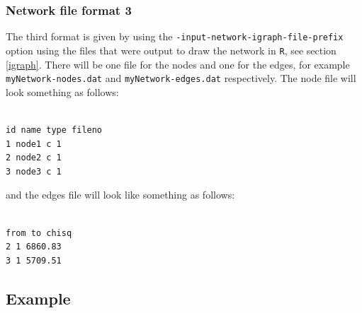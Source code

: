 \documentclass[a4paper,12pt]{article}
\newcommand{\code}[1]{{\footnotesize{{\tt #1}}}}
\begin{document}

\subsubsection{Network file format 3}
\label{input-network-formats-format3}

The third format is given by using the \code{-input-network-igraph-file-prefix} option using the files that were output to draw the network in \code{R}, see  section \ref{igraph}. There will be one file for the nodes and one for the edges, for example \code{myNetwork-nodes.dat} and \code{myNetwork-edges.dat} respectively. The node file will look something as follows: 
\vspace{0.35cm} \begin{lstlisting}

id name type fileno
1 node1 c 1
2 node2 c 1
3 node3 c 1

\end{lstlisting} \vspace{0.35cm}
and the edges file will look like something as follows: 
\vspace{0.35cm} \begin{lstlisting}

from to chisq
2 1 6860.83
3 1 5709.51

\end{lstlisting} \vspace{0.35cm}



\subsection{Example}
\label{input-network-example}
\end{document}
